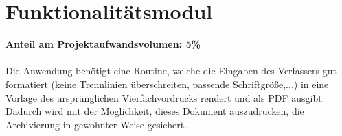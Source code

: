 \section{Funktionalitätsmodul}
\textbf{Anteil am Projektaufwandsvolumen: 5\%}\\ \\
Die Anwendung benötigt eine Routine, welche die Eingaben des Verfassers gut formatiert (keine Trennlinien überschreiten, passende Schriftgröße,...) in eine Vorlage des ursprünglichen Vierfachvordrucks rendert und als PDF ausgibt. Dadurch wird mit der Möglichkeit, dieses Dokument auszudrucken, die Archivierung in gewohnter Weise gesichert.
